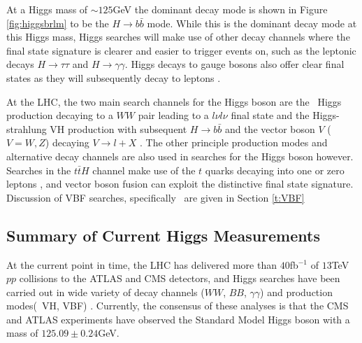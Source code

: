 		At a Higgs mass of $\sim125$GeV the dominant decay mode is shown in Figure \ref{fig:higgsbrlm} to be the $H\rightarrow b\bar{b}$ mode. While this is the dominant decay mode at this Higgs mass, Higgs searches will make use of other decay channels where the final state signature is clearer and easier to trigger events on, such as the leptonic decays $H\rightarrow\tau\tau$ and $H\rightarrow\gamma\gamma$. Higgs decays to gauge bosons also offer clear final states as they will subsequently decay to leptons \cite{higgssearch}.

		At the LHC, the two main search channels for the Higgs boson are the \ggF\ Higgs production decaying to a $WW$ pair leading to a $l\nu l\nu$ final state \cite{hprod, searchggf} and the Higgs-strahlung VH production with subsequent $H\rightarrow b\bar{b}$ and the vector boson $V$ ($V = W, Z$) decaying $V\rightarrow l+X$ \cite{hprod, searchvh}. The other principle production modes and alternative decay channels are also used in searches for the Higgs boson however. Searches in the $t\bar{t}H$ channel make use of the $t$ quarks decaying into one or zero leptons \cite{tth}, and vector boson fusion can exploit the distinctive final state signature. Discussion of VBF searches, specifically \VBFHBB\ are given in Section \ref{t:VBF}

	\subsection{Summary of Current Higgs Measurements}

		At the current point in time, the LHC has delivered more than $40$fb$^{-1}$ of $13$TeV $pp$ collisions to the ATLAS and CMS detectors, and Higgs searches have been carried out in wide variety of decay channels ($WW$, $BB$, $\gamma\gamma$) and production modes(\ggf\ VH, VBF) \cite{pdg, VBFHbb8tev, vbfsearchggf, searchvh, tth}. Currently, the consensus of these analyses is that the CMS and ATLAS experiments have observed the Standard Model Higgs boson with a mass of $125.09\pm0.24$GeV\cite{pdg}.

